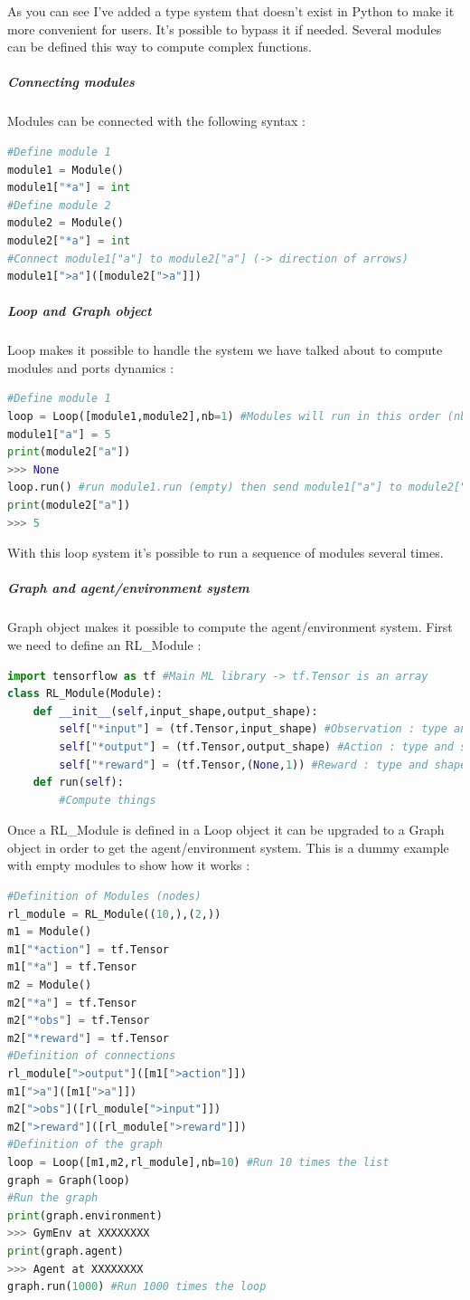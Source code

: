 \documentclass[11pt]{article}
\begin{document}
As you can see I've added a type system that doesn't exist in Python to make it more convenient for users. It's possible to bypass it if needed. Several modules can be defined this way to compute complex functions.
\subparagraph{Connecting modules}
Modules can be connected with the following syntax :
\begin{lstlisting}[language=Python]
#Define module 1
module1 = Module()
module1["*a"] = int
#Define module 2
module2 = Module()
module2["*a"] = int
#Connect module1["a"] to module2["a"] (-> direction of arrows)
module1[">a"]([module2[">a"]])
\end{lstlisting}
\subparagraph{Loop and Graph object}
Loop makes it possible to handle the system we have talked about to compute modules and ports dynamics :
\begin{lstlisting}[language=Python]
#Define module 1
loop = Loop([module1,module2],nb=1) #Modules will run in this order (nb=1 iteration of the loop)
module1["a"] = 5
print(module2["a"])
>>> None
loop.run() #run module1.run (empty) then send module1["a"] to module2["a"] and run module2.run() (empty)
print(module2["a"])
>>> 5
\end{lstlisting}
With this loop system it's possible to run a sequence of modules several times.
\subparagraph{Graph and agent/environment system}
Graph object makes it possible to compute the agent/environment system. First we need to define an RL\_Module :
\begin{lstlisting}[language=Python]
import tensorflow as tf #Main ML library -> tf.Tensor is an array
class RL_Module(Module):
	def __init__(self,input_shape,output_shape):
		self["*input"] = (tf.Tensor,input_shape) #Observation : type and shape
		self["*output"] = (tf.Tensor,output_shape) #Action : type and shape
		self["*reward"] = (tf.Tensor,(None,1)) #Reward : type and shape
	def run(self):
		#Compute things
\end{lstlisting}
Once a RL\_Module is defined in a Loop object it can be upgraded to a Graph object in order to get the agent/environment system. This is a dummy example with empty modules to show how it works :
\begin{lstlisting}[language=Python]
#Definition of Modules (nodes)
rl_module = RL_Module((10,),(2,))
m1 = Module()
m1["*action"] = tf.Tensor
m1["*a"] = tf.Tensor
m2 = Module()
m2["*a"] = tf.Tensor
m2["*obs"] = tf.Tensor
m2["*reward"] = tf.Tensor
#Definition of connections
rl_module[">output"]([m1[">action"]])
m1[">a"]([m1[">a"]])
m2[">obs"]([rl_module[">input"]])
m2[">reward"]([rl_module[">reward"]])
#Definition of the graph
loop = Loop([m1,m2,rl_module],nb=10) #Run 10 times the list
graph = Graph(loop)
#Run the graph
print(graph.environment)
>>> GymEnv at XXXXXXXX
print(graph.agent)
>>> Agent at XXXXXXXX
graph.run(1000) #Run 1000 times the loop
\end{lstlisting}
\end{document}
